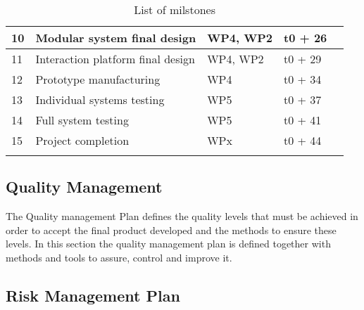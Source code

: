 \begin{longtable}[H]{p{1.9cm} p{3cm} p{2.2cm} p{2cm} l }
 	10 & Modular system final design & WP4, WP2 & t0 + 26 & \vspace{0.2cm} \\
	
	\midrule

	11 & Interaction platform final design & WP4, WP2 & t0 + 29 & \vspace{0.2cm} \\

	\midrule

	12 & Prototype manufacturing & WP4 & t0 + 34 & \vspace{0.2cm} \\

	\midrule

	13 & Individual systems testing & WP5 & t0 + 37 & \vspace{0.2cm} \\
	 
	\midrule

	14 & Full system testing & WP5 & t0 + 41 & \vspace{0.2cm} \\

	\midrule

	15 & Project completion & WPx & t0 + 44 & \vspace{0.2cm} \\

	\bottomrule[2pt]
	
	\caption{List of milstones}
	\label{workpackages}
\end{longtable}

\subsection{Quality Management}

The Quality management Plan defines the quality levels that must be achieved in order to accept the final product developed and the methods to ensure these levels. In this section the quality management plan is defined together with methods and tools to assure, control and improve it.





\subsection{Risk Management Plan}


